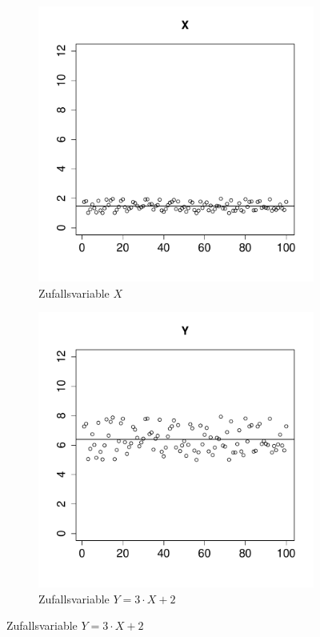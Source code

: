 \begin{figure}[h!]
\centering
\begin{subfigure}[b]{0.48\textwidth}
\includegraphics{verteilungen-037}
\caption{Zufallsvariable $X$}
\end{subfigure}
\begin{subfigure}[b]{0.48\textwidth}
\includegraphics{verteilungen-038}
\caption{Zufallsvariable $Y=3\cdot X +2$}
\end{subfigure}


\end{figure}
